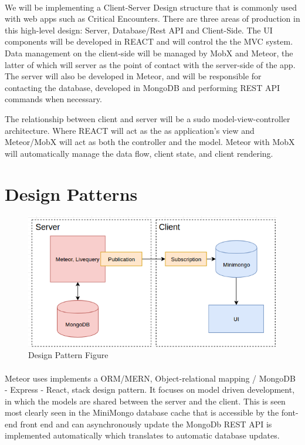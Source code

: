 \documentclass[12pt,a4paper]{report}
\begin{document}
	\paragraph{}We will be implementing a Client-Server Design structure that is commonly used with web apps such as Critical Encounters. There are three areas of production in this high-level design: Server, Database/Rest API and Client-Side. The UI components will be developed in REACT and will control the the MVC system. Data management on the client-side will be managed by MobX and Meteor, the latter of which will server as the point of contact with the server-side of the app. The server will also be developed in Meteor, and will be responsible for contacting the database, developed in MongoDB and performing REST API commands when necessary. \par
	The relationship between client and server will be a sudo model-view-controller architecture. Where REACT will act as the as application's view and Meteor/MobX will act as both the controller and the model. Meteor with MobX will automatically manage the data flow, client state, and client rendering.
	
	\section {Design Patterns}
	
	\begin{figure}[H]
		\centering
		\includegraphics[scale=.7]{orm.png}
		\caption{Design Pattern Figure}
		\label{fig: Design Pattern Figure}
	\end{figure}
	
	\paragraph{} Meteor uses implements a ORM/MERN, Object-relational mapping / MongoDB - Express - React, stack design pattern. It focuses on model driven development, in which the models are shared between the server and the client. This is seen most clearly seen in the MiniMongo database cache that is accessible by the font-end front end and can asynchronously update the MongoDb REST API is implemented automatically which translates to automatic database updates.
	
\end{document}

